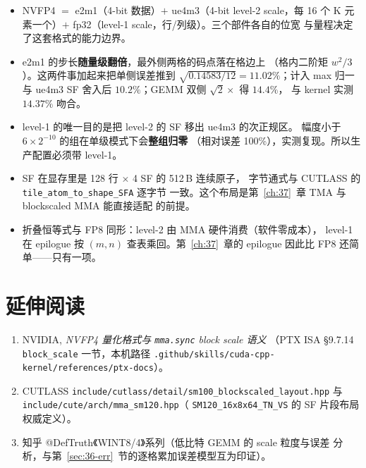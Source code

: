 \begin{itemize}[itemsep=2pt,topsep=3pt]
  \item NVFP4 $=$ e2m1（4-bit 数据）$+$ ue4m3（4-bit level-2 scale，每 16 个
        K 元素一个）$+$ fp32（level-1 scale，行/列级）。三个部件各自的位宽
        与量程决定了这套格式的能力边界。
  \item e2m1 的步长\textbf{随量级翻倍}，最外侧两格的码点落在格边上
        （格内二阶矩 $w^2/3$）。这两件事加起来把单侧误差推到
        $\sqrt{0.14583/12}=11.02\%$；计入 max 归一与 ue4m3 SF 舍入后
        $10.2\%$；GEMM 双侧 $\sqrt2\times$ 得 $\mathbf{14.4\%}$，
        与 kernel 实测 $14.37\%$ 吻合。
  \item level-1 的唯一目的是把 level-2 的 SF 移出 ue4m3 的次正规区。
        幅度小于 $6\times2^{-10}$ 的组在单级模式下会\textbf{整组归零}
        （相对误差 100\%），实测复现。所以生产配置必须带 level-1。
  \item SF 在显存里是 128 行 $\times$ 4 SF 的 512\,B 连续原子，
        字节通式与 CUTLASS 的 \texttt{tile\_atom\_to\_shape\_SFA} 逐字节
        一致。这个布局是第~\ref{ch:37}~章 TMA 与 blockscaled MMA 能直接适配
        的前提。
  \item 折叠恒等式与 FP8 同形：level-2 由 MMA 硬件消费（软件零成本），
        level-1 在 epilogue 按 $(m,n)$ 查表乘回。第~\ref{ch:37}~章的
        epilogue 因此比 FP8 还简单——只有一项。
\end{itemize}

\section*{延伸阅读}

\begin{enumerate}[itemsep=2pt,topsep=3pt]
  \item NVIDIA, \emph{NVFP4 量化格式与 \texttt{mma.sync} block scale 语义}
        （PTX ISA \S9.7.14 \texttt{block\_scale} 一节，本机路径
        \texttt{.github/\allowbreak skills/\allowbreak cuda-cpp-kernel/\allowbreak references/\allowbreak ptx-docs}）。
  \item CUTLASS \texttt{include/\allowbreak cutlass/\allowbreak detail/\allowbreak sm100\_blockscaled\_layout.hpp}
        与 \texttt{include/\allowbreak cute/\allowbreak arch/\allowbreak mma\_sm120.hpp}（
        \texttt{SM120\_16x8x64\_TN\_VS} 的 SF 片段布局权威定义）。
  \item 知乎 @DefTruth《WINT8/4》系列（低比特 GEMM 的 scale 粒度与误差
        分析，与第~\ref{sec:36-err}~节的逐格累加误差模型互为印证）。
\end{enumerate}
